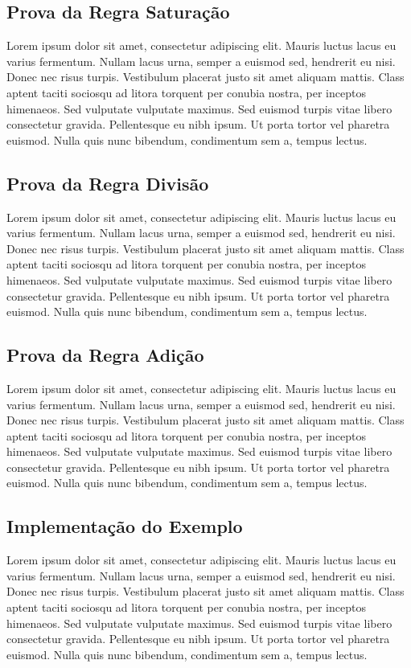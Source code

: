 \documentclass[conference]{IEEEtran}
\begin{document}
\subsection{Prova da Regra Saturação}
Lorem ipsum dolor sit amet, consectetur adipiscing elit. Mauris luctus lacus eu varius fermentum. Nullam lacus urna, semper a euismod sed, hendrerit eu nisi. Donec nec risus turpis. Vestibulum placerat justo sit amet aliquam mattis. Class aptent taciti sociosqu ad litora torquent per conubia nostra, per inceptos himenaeos. Sed vulputate vulputate maximus. Sed euismod turpis vitae libero consectetur gravida. Pellentesque eu nibh ipsum. Ut porta tortor vel pharetra euismod. Nulla quis nunc bibendum, condimentum sem a, tempus lectus.

\subsection{Prova da Regra Divisão}
Lorem ipsum dolor sit amet, consectetur adipiscing elit. Mauris luctus lacus eu varius fermentum. Nullam lacus urna, semper a euismod sed, hendrerit eu nisi. Donec nec risus turpis. Vestibulum placerat justo sit amet aliquam mattis. Class aptent taciti sociosqu ad litora torquent per conubia nostra, per inceptos himenaeos. Sed vulputate vulputate maximus. Sed euismod turpis vitae libero consectetur gravida. Pellentesque eu nibh ipsum. Ut porta tortor vel pharetra euismod. Nulla quis nunc bibendum, condimentum sem a, tempus lectus.

\subsection{Prova da Regra Adição}
Lorem ipsum dolor sit amet, consectetur adipiscing elit. Mauris luctus lacus eu varius fermentum. Nullam lacus urna, semper a euismod sed, hendrerit eu nisi. Donec nec risus turpis. Vestibulum placerat justo sit amet aliquam mattis. Class aptent taciti sociosqu ad litora torquent per conubia nostra, per inceptos himenaeos. Sed vulputate vulputate maximus. Sed euismod turpis vitae libero consectetur gravida. Pellentesque eu nibh ipsum. Ut porta tortor vel pharetra euismod. Nulla quis nunc bibendum, condimentum sem a, tempus lectus.

\subsection{Implementação do Exemplo}
Lorem ipsum dolor sit amet, consectetur adipiscing elit. Mauris luctus lacus eu varius fermentum. Nullam lacus urna, semper a euismod sed, hendrerit eu nisi. Donec nec risus turpis. Vestibulum placerat justo sit amet aliquam mattis. Class aptent taciti sociosqu ad litora torquent per conubia nostra, per inceptos himenaeos. Sed vulputate vulputate maximus. Sed euismod turpis vitae libero consectetur gravida. Pellentesque eu nibh ipsum. Ut porta tortor vel pharetra euismod. Nulla quis nunc bibendum, condimentum sem a, tempus lectus.
\end{document}
